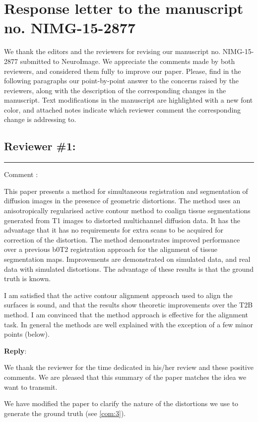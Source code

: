 \documentclass[9pt]{memoir}
\newcounter{reviewpoint}
\newenvironment{reviewpoint}%
{\refstepcounter{reviewpoint}\par\medskip\vspace{3ex}\hrule\vspace{1.5ex}\par\noindent%
   {\fontseries{b}\selectfont Comment \arabic{reviewpoint}:}
   \begingroup%
   \color{black!60}
   \fontshape{it}\selectfont %

}
{\endgroup\label{com:\thereviewpoint}\par\medskip}
\newcommand{\reply}{\par\fontshape{n}\selectfont \noindent \textbf{Reply}:\ }
\begin{document}
\hypersetup{linkcolor=black!60, citecolor=black!60, urlcolor=black!60}

\section*{Response letter to the manuscript no. NIMG-15-2877}

\bigskip
\noindent We thank the editors and the reviewers for revising our manuscript no. NIMG-15-2877 submitted to NeuroImage.
We appreciate the comments made by both reviewers, and considered them fully to improve our paper.
Please, find in the following paragraphs our point-by-point answer to the concerns raised by the reviewers,
  along with the description of the corresponding changes in the manuscript.
Text modifications in the manuscript are highlighted with a new font color, and attached notes indicate which reviewer comment
  the corresponding change is addressing to.

\bigskip
\bigskip
\subsection*{Reviewer \#1:}
\begin{reviewpoint}
This paper presents a method for simultaneous registration and segmentation of diffusion images in the presence of geometric distortions. The method uses an anisotropically regularised active contour method to coalign tissue segmentations generated from T1 images to distorted multichannel diffusion data. It has the advantage that it has no requirements for extra scans to be acquired for correction of the distortion. The method demonstrates improved performance over a previous b0T2 registration approach for the alignment of tissue segmentation maps. Improvements are demonstrated on simulated data, and real data with simulated distortions. The advantage of these results is that the ground truth is known.


I am satisfied that the active contour alignment approach used to align the surfaces is sound, and that the results show theoretic improvements over the T2B method. I am convinced that the method approach is effective for the alignment task. In general the methods are well explained with the exception of a few minor points (below).
\end{reviewpoint}
\reply{%
We thank the reviewer for the time dedicated in his/her review and these positive comments.
We are pleased that this summary of the paper matches the idea we want to transmit.

We have modified the paper to clarify the nature of the distortions we use to generate the
  ground truth (see \autoref{com:3}).
}
\end{document}
